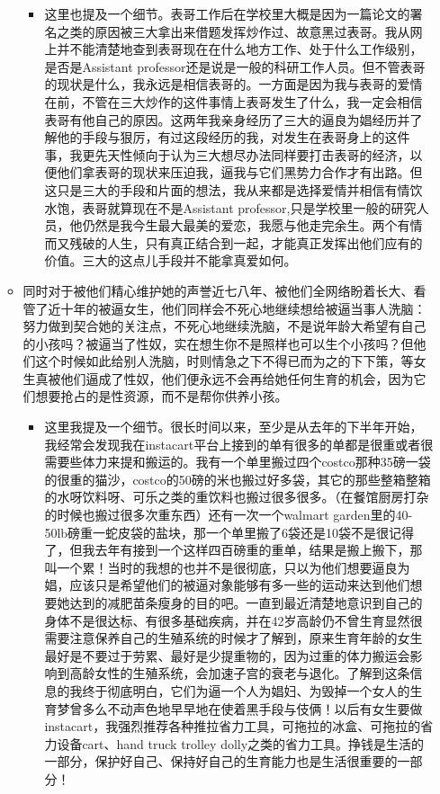 \documentclass[9pt, b5paper]{article}
\begin{document}
\begin{itemize}
\begin{itemize}
\begin{itemize}
\item 这里也提及一个细节。表哥工作后在学校里大概是因为一篇论文的署名之类的原因被三大拿出来借题发挥炒作过、故意黑过表哥。我从网上并不能清楚地查到表哥现在在什么地方工作、处于什么工作级别，是否是Assistant professor还是说是一般的科研工作人员。但不管表哥的现状是什么，我永远是相信表哥的。一方面是因为我与表哥的爱情在前，不管在三大炒作的这件事情上表哥发生了什么，我一定会相信表哥有他自己的原因。这两年我亲身经历了三大的逼良为娼经历并了解他的手段与狠厉，有过这段经历的我，对发生在表哥身上的这件事，我更先天性倾向于认为三大想尽办法同样要打击表哥的经济，以便他们拿表哥的现状来压迫我，逼我与它们黑势力合作才有出路。但这只是三大的手段和片面的想法，我从来都是选择爱情并相信有情饮水饱，表哥就算现在不是Assistant professor,只是学校里一般的研究人员，他仍然是我今生最大最美的爱恋，我愿与他走完余生。两个有情而又残破的人生，只有真正结合到一起，才能真正发挥出他们应有的价值。三大的这点儿手段并不能拿真爱如何。
\end{itemize}
\item 同时对于被他们精心维护她的声誉近七八年、被他们全网络盼着长大、看管了近十年的被逼女生，他们同样会不死心地继续想给被逼当事人洗脑：努力做到契合她的关注点，不死心地继续洗脑，不是说年龄大希望有自己的小孩吗？被逼当了性奴，实在想生你不是照样也可以生个小孩吗？但他们这个时候如此给别人洗脑，时则情急之下不得已而为之的下下策，等女生真被他们逼成了性奴，他们便永远不会再给她任何生育的机会，因为它们想要抢占的是性资源，而不是帮你供养小孩。
\begin{itemize}
\item 这里我提及一个细节。很长时间以来，至少是从去年的下半年开始，我经常会发现我在instacart平台上接到的单有很多的单都是很重或者很需要些体力来提和搬运的。我有一个单里搬过四个costco那种35磅一袋的很重的猫沙，costco的50磅的米也搬过好多袋，其它的那些整箱整箱的水呀饮料呀、可乐之类的重饮料也搬过很多很多。（在餐馆厨房打杂的时候也搬过很多次重东西）还有一次一个walmart garden里的40-50lb磅重一蛇皮袋的盐块，那一个单里搬了6袋还是10袋不是很记得了，但我去年有接到一个这样四百磅重的重单，结果是搬上搬下，那叫一个累！当时的我想的也并不是很彻底，只以为他们想要逼良为娼，应该只是希望他们的被逼对象能够有多一些的运动来达到他们想要她达到的减肥苗条瘦身的目的吧。一直到最近清楚地意识到自己的身体不是很达标、有很多基础疾病，并在42岁高龄仍不曾生育显然很需要注意保养自己的生殖系统的时候才了解到，原来生育年龄的女生最好是不要过于劳累、最好是少提重物的，因为过重的体力搬运会影响到高龄女性的生殖系统，会加速子宫的衰老与退化。了解到这条信息的我终于彻底明白，它们为逼一个人为娼妇、为毁掉一个女人的生育梦曾多么不动声色地早早地在使着黑手段与伎俩！以后有女生要做instacart，我强烈推荐各种推拉省力工具，可拖拉的冰盒、可拖拉的省力设备cart、hand truck trolley dolly之类的省力工具。挣钱是生活的一部分，保护好自己、保持好自己的生育能力也是生活很重要的一部分！

\end{itemize}
\end{itemize}
\end{itemize}
\end{document}
